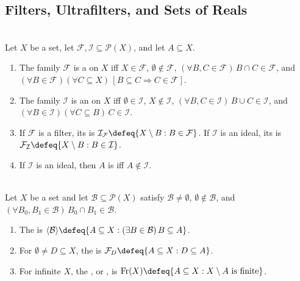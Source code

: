 \subsection{Filters, Ultrafilters, and Sets of Reals}

\begin{definition} \label{def:filters-ideals-and-duality} \\
Let $X$ be a set, let $\mathcal{F},\mathcal{I}\subseteq\mathcal{P}(X)$, and let $A\subseteq X$.
\begin{enumerate}[label=(\roman*)]
\setlength{\itemsep}{0pt}
\item The family $\mathcal{F}$ is a  on $X$ iff $X\in\mathcal{F}$, $\emptyset\notin\mathcal{F}$, $(\forall B,C\in\mathcal{F})\,B\cap C\in\mathcal{F}$, and $(\forall B\in\mathcal{F})(\forall C\subseteq X)\,[B\subseteq C\Rightarrow C\in\mathcal{F}]$.
\item The family $\mathcal{I}$ is an  on $X$ iff $\emptyset\in\mathcal{I}$, $X\notin\mathcal{I}$, $(\forall B,C\in\mathcal{I})\,B\cup C\in\mathcal{I}$, and $(\forall B\in\mathcal{I})(\forall C\subseteq B)\,C\in\mathcal{I}$.
\item If $\mathcal{F}$ is a filter, its  is $\mathcal{I}_{\mathcal{F}}\defeq\{X\setminus B:B\in\mathcal{F}\}$. If $\mathcal{I}$ is an ideal, its  is $\mathcal{F}_{\mathcal{I}}\defeq\{X\setminus B:B\in\mathcal{I}\}$.
\item If $\mathcal{I}$ is an ideal, then $A$ is  iff $A\notin\mathcal{I}$.
\end{enumerate}
\end{definition}

\begin{definition} \label{def:generated-principal-and-frechet-filters} \\
Let $X$ be a set and let $\mathcal{B}\subseteq\mathcal{P}(X)$ satisfy $\mathcal{B}\neq\emptyset$, $\emptyset\notin\mathcal{B}$, and $(\forall B_0,B_1\in\mathcal{B})\,B_0\cap B_1\in\mathcal{B}$.
\begin{enumerate}[label=(\roman*)]
\setlength{\itemsep}{0pt}
\item The  is $\langle\mathcal{B}\rangle\defeq\{A\subseteq X:(\exists B\in\mathcal{B})\,B\subseteq A\}$.
\item For $\emptyset\neq D\subseteq X$, the  is $\mathcal{F}_D\defeq\{A\subseteq X:D\subseteq A\}$.
\item For infinite $X$, the , or , is $\operatorname{Fr}(X)\defeq\{A\subseteq X:X\setminus A\text{ is finite}\}$.
\end{enumerate}
\end{definition}

